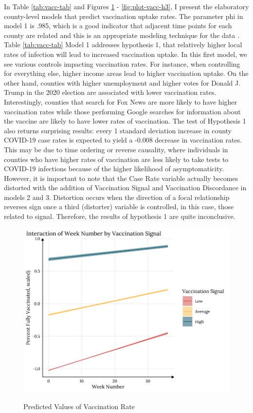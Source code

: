 In Table \ref{tab:vacc-tab} and Figures \ref{fig:plot-vacc-h2} -
\ref{fig:plot-vacc-h3}, I present the elaboratory county-level models that
predict vaccination uptake rates. The parameter phi in model 1 is .985, which is
a good indicator that adjacent time points for each county are related and this
is an appropriate modeling technique for the data \citep{finch_etal14}. Table
\ref{tab:vacc-tab} Model 1 addresses hypothesis 1, that relatively higher local
rates of infection will lead to increased vaccination uptake. In this first
model, we see various controls impacting vaccination rates. For instance, when
controlling for everything else, higher income areas lead to higher vaccination
uptake. On the other hand, counties with higher unemployment and higher votes
for Donald J. Trump in the 2020 election are associated with lower vaccination
rates. Interestingly, counties that search for Fox News are more likely to have
higher vaccination rates while those performing Google searches for information
about the vaccine are likely to have lower rates of vaccination. The test of
Hypothesis 1 also returns surprising results: every 1 standard deviation
increase in county COVID-19 case rates is expected to yield a -0.008 decrease in
vaccination rates. This may be due to time ordering or reverse causality, where
individuals in counties who have higher rates of vaccination are less likely to
take tests to COVID-19 infections because of the higher likelihood of
asymptomaticity. However, it is important to note that the Case Rate variable
actually becomes distorted with the addition of Vaccination Signal and
Vaccination Discordance in models 2 and 3. Distortion occurs when the direction
of a focal relationship reverses sign once a third (distorter) variable is
controlled, in this case, those related to signal. Therefore, the results of
hypothesis 1 are quite inconclusive.

\begin{figure}
{\centering \includegraphics[width=0.8\linewidth]{figs/paper3/plot-vacc-h2-1}}
\caption{Predicted Values of Vaccination Rate}\label{fig:plot-vacc-h2}
\end{figure}

